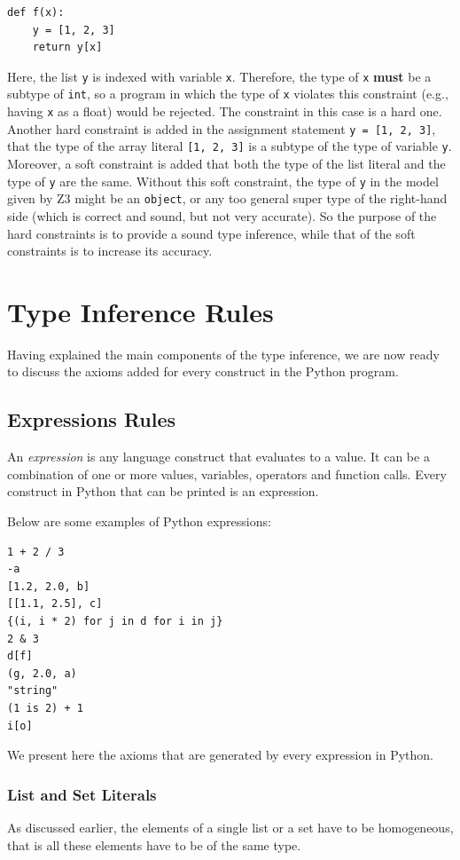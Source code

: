 \begin{lstlisting}
def f(x):
	y = [1, 2, 3]
	return y[x]
\end{lstlisting}

Here, the list \lstinline|y| is indexed with variable \lstinline|x|. Therefore, the type of \lstinline|x| \textbf{must} be a subtype of \lstinline|int|, so a program in which the type of \lstinline|x| violates this constraint (e.g., having \lstinline|x| as a float) would be rejected. The constraint in this case is a hard one. Another hard constraint is added in the assignment statement \lstinline|y = [1, 2, 3]|, that the type of the array literal \lstinline|[1, 2, 3]| is a subtype of the type of variable \lstinline|y|. Moreover, a soft constraint is added that both the type of the list literal and the type of \lstinline|y| are the same. Without this soft constraint, the type of \lstinline|y| in the model given by Z3 might be an \lstinline|object|, or any too general super type of the right-hand side (which is correct and sound, but not very accurate). So the purpose of the hard constraints is to provide a sound type inference, while that of the soft constraints is to increase its accuracy.
\section{Type Inference Rules}
Having explained the main components of the type inference, we are now ready to discuss the axioms added for every construct in the Python program.
\subsection{Expressions Rules}
An \textit{expression} is any language construct that evaluates to a value. It can be a combination of one or more values, variables, operators and function calls. Every construct in Python that can be printed is an expression.

Below are some examples of Python expressions:
\begin{lstlisting}
1 + 2 / 3
-a
[1.2, 2.0, b]
[[1.1, 2.5], c]
{(i, i * 2) for j in d for i in j}
2 & 3
d[f]
(g, 2.0, a)
"string"
(1 is 2) + 1
i[o]
\end{lstlisting}

We present here the axioms that are generated by every expression in Python.

\subsubsection{List and Set Literals}
As discussed earlier, the elements of a single list or a set have to be homogeneous, that is all these elements have to be of the same type.

